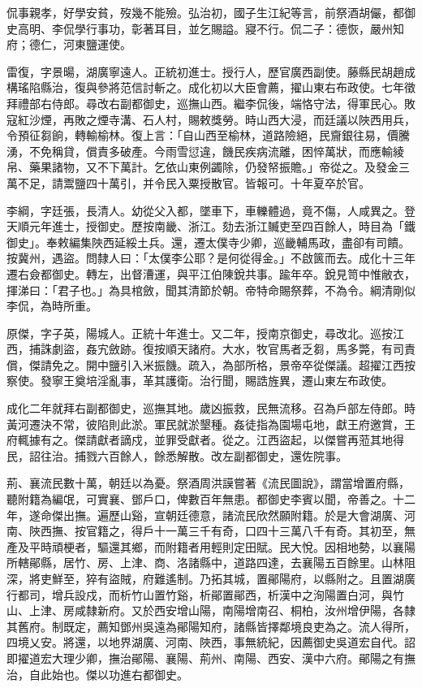\begin{pinyinscope}
侃事親孝，好學安貧，歿幾不能殮。弘治初，國子生江紀等言，前祭酒胡儼，都御史高明、李侃學行事功，彰著耳目，並乞賜謚。寢不行。侃二子：德恢，嚴州知府；德仁，河東鹽運使。

雷復，字景暘，湖廣寧遠人。正統初進士。授行人，歷官廣西副使。藤縣民胡趙成構瑤陷縣治，復與參將范信討斬之。成化初以大臣會薦，擢山東右布政使。七年徵拜禮部右侍郎。尋改右副都御史，巡撫山西。繼李侃後，端恪守法，得軍民心。敗寇紅沙煙，再敗之煙寺溝、石人村，賜敕獎勞。時山西大浸，而廷議以陜西用兵，令預征芻餉，轉輸榆林。復上言：「自山西至榆林，道路險絕，民齎銀往易，價騰湧，不免稱貸，償責多破產。今雨雪愆違，饑民疾病流離，困悴萬狀，而應輸綾帛、藥果諸物，又不下萬計。乞依山東例蠲除，仍發帑振贍。」帝從之。及發金三萬不足，請鬻鹽四十萬引，并令民入粟授散官。皆報可。十年夏卒於官。

李綱，字廷張，長清人。幼從父入都，墜車下，車轢體過，竟不傷，人咸異之。登天順元年進士，授御史。歷按南畿、浙江。劾去浙江贓吏至四百餘人，時目為「鐵御史」。奉敕編集陜西延綏土兵。還，遷太僕寺少卿，巡畿輔馬政，盡卻有司饋。按冀州，遇盜。問隸人曰：「太僕李公耶？是何從得金。」不啟篋而去。成化十三年遷右僉都御史。轉左，出督漕運，與平江伯陳銳共事。踰年卒。銳見笥中惟敝衣，揮涕曰：「君子也。」為具棺斂，聞其清節於朝。帝特命賜祭葬，不為令。綱清剛似李侃，為時所重。

原傑，字子英，陽城人。正統十年進士。又二年，授南京御史，尋改北。巡按江西，捕誅劇盜，姦宄斂跡。復按順天諸府。大水，牧官馬者乏芻，馬多斃，有司責償，傑請免之。開中鹽引入米振饑。疏入，為部所格，景帝卒從傑議。超擢江西按察使。發寧王奠培淫亂事，革其護衛。治行聞，賜誥旌異，遷山東左布政使。

成化二年就拜右副都御史，巡撫其地。歲凶振救，民無流移。召為戶部左侍郎。時黃河遷決不常，彼陷則此淤。軍民就淤墾種。姦徒指為園場屯地，獻王府邀賞，王府輒據有之。傑請獻者謫戍，並罪受獻者。從之。江西盜起，以傑嘗再蒞其地得民，詔往治。捕戮六百餘人，餘悉解散。改左副都御史，還佐院事。

荊、襄流民數十萬，朝廷以為憂。祭酒周洪謨嘗著《流民圖說》，謂當增置府縣，聽附籍為編氓，可實襄、鄧戶口，俾數百年無患。都御史李賓以聞，帝善之。十二年，遂命傑出撫。遍歷山谿，宣朝廷德意，諸流民欣然願附籍。於是大會湖廣、河南、陜西撫、按官籍之，得戶十一萬三千有奇，口四十三萬八千有奇。其初至，無產及平時頑梗者，驅還其鄉，而附籍者用輕則定田賦。民大悅。因相地勢，以襄陽所轄鄖縣，居竹、房、上津、商、洛諸縣中，道路四達，去襄陽五百餘里。山林阻深，將吏鮮至，猝有盜賊，府難遙制。乃拓其城，置鄖陽府，以縣附之。且置湖廣行都司，增兵設戍，而析竹山置竹谿，析鄖置鄖西，析漢中之洵陽置白河，與竹山、上津、房咸隸新府。又於西安增山陽，南陽增南召、桐柏，汝州增伊陽，各隸其舊府。制既定，薦知鄧州吳遠為鄖陽知府，諸縣皆擇鄰境良吏為之。流人得所，四境乂安。將還，以地界湖廣、河南、陜西，事無統紀，因薦御史吳道宏自代。詔即擢道宏大理少卿，撫治鄖陽、襄陽、荊州、南陽、西安、漢中六府。鄖陽之有撫治，自此始也。傑以功進右都御史。


\end{pinyinscope}
